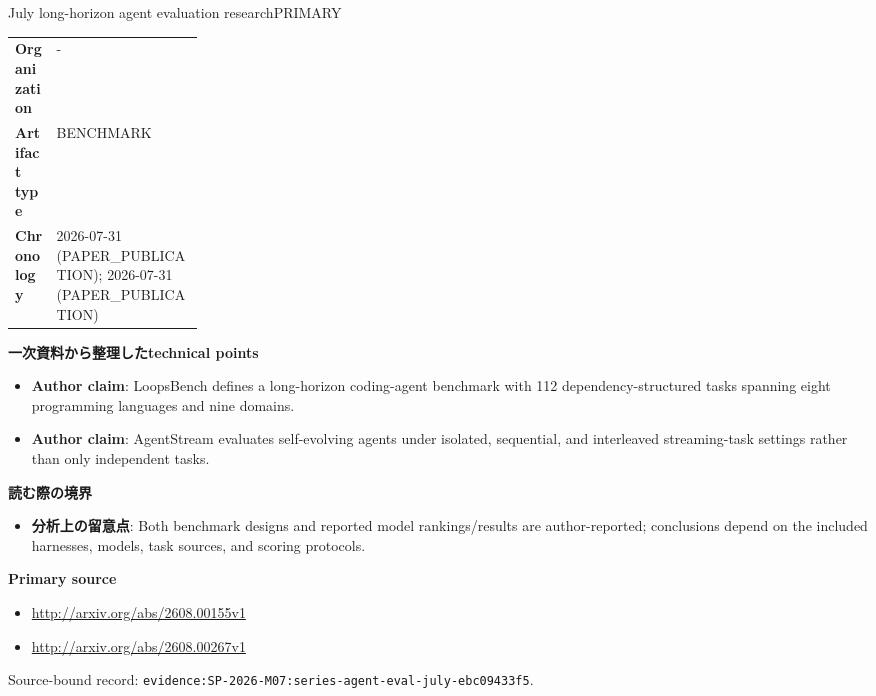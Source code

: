 \begin{technicalnote}{July long-horizon agent evaluation research}{PRIMARY}
\begin{tabularx}{\linewidth}{@{}>{\bfseries}p{0.22\linewidth}X@{}}
Organization & - \\
Artifact type & BENCHMARK \\
Chronology & 2026-07-31 (PAPER\_PUBLICATION); 2026-07-31 (PAPER\_PUBLICATION) \\
\end{tabularx}
\smallskip
{\bfseries 一次資料から整理したtechnical points}
\begin{itemize}[leftmargin=1.5em,itemsep=0.35em]
\item \textbf{Author claim}: LoopsBench defines a long-horizon coding-agent benchmark with 112 dependency-structured tasks spanning eight programming languages and nine domains.
\item \textbf{Author claim}: AgentStream evaluates self-evolving agents under isolated, sequential, and interleaved streaming-task settings rather than only independent tasks.
\end{itemize}
{\bfseries 読む際の境界}
\begin{itemize}[leftmargin=1.5em,itemsep=0.35em]
\item \textbf{分析上の留意点}: Both benchmark designs and reported model rankings/results are author-reported; conclusions depend on the included harnesses, models, task sources, and scoring protocols.
\end{itemize}
{\bfseries Primary source}
\begingroup\sloppy
\begin{itemize}[leftmargin=1.5em,itemsep=0.25em]
\item {\scriptsize\url{http://arxiv.org/abs/2608.00155v1}}
\item {\scriptsize\url{http://arxiv.org/abs/2608.00267v1}}
\end{itemize}
\endgroup
{\scriptsize\color{SurveyMuted}Source-bound record: \texttt{evidence:SP-2026-M07:series-agent-eval-july-ebc09433f5}.}
\end{technicalnote}
\medskip

